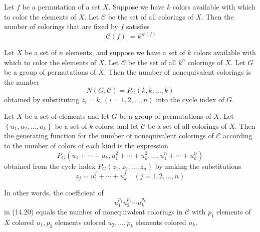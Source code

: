 \begin{theorem}
  \label{thm:14.3.1}
  Let $f$ be a permutation of a set $X$. Suppose we have $k$ colors available with which to color the elements of $X$. Let $\mathcal{C}$ be the set of all colorings of $X$. Then the number of colorings that are fixed by $f$ satisfies
  $$
  |\mathcal{C}(f)|=k^{\#(f)}
  $$
\end{theorem}

\begin{theorem}
  \label{thm:14.3.2}
  Let $X$ be a set of $n$ elements, and suppose we have a set of $k$ colors available with which to color the elements of $X$. Let $\mathcal{C}$ be the set of all $k^n$ colorings of $X$. Let $G$ be a group of permutations of $X$. Then the number of nonequivalent colorings is the number
  $$
  N(G, \mathcal{C})=P_G(k, k, \ldots, k)
  $$
  obtained by substituting $z_i=k,(i=1,2, \ldots, n)$ into the cycle index of $G$.
\end{theorem}

\begin{theorem}
  \label{thm:14.3.3}
  Let $X$ be a set of elements and let $G$ be a group of permutations of $X$. Let $\left\{u_1, u_2, \ldots, u_k\right\}$ be a set of $k$ colors, and let $\mathcal{C}$ be a set of all colorings of $X$. Then the generating function for the number of nonequivalent colorings of $\mathcal{C}$ according to the number of colors of each kind is the expression
  \begin{equation}\label{14.20}
    P_G\left(u_1+\cdots+u_k, u_1^2+\cdots+u_k^2, \ldots, u_1^n+\cdots+u_k^n\right)
  \end{equation}
  obtained from the cycle index $P_G\left(z_1, z_2, \ldots, z_n\right)$ by making the substitutions
  $$
  z_j=u_1^j+\cdots+u_k^j \quad(j=1,2, \ldots, n)
  $$

  In other words, the coefficient of
  $$
  u_1^{p_1} u_2^{p_2} \cdots u_k^{p_k}
  $$
  in (14.20) equals the number of nonequivalent colorings in $\mathcal{C}$ with $p_1$ elements of $X$ colored $u_1, p_2$ elements colored $u_2, \ldots, p_k$ elements colored $u_k$.
\end{theorem} 


















